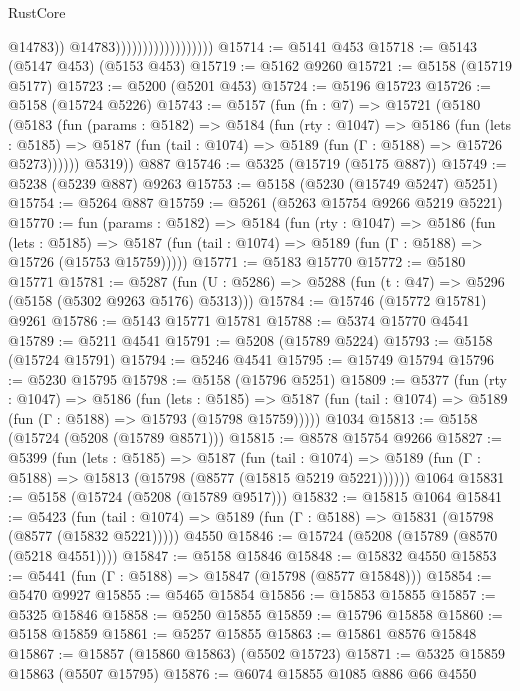\begin{lexlean}{RustCore}
\begin{coremodule}
                                            @14783))
                                        @14783))))))))))))))))))
@15714 := @5141 @453
@15718 := @5143 (@5147 @453) (@5153 @453)
@15719 := @5162 @9260
@15721 := @5158 (@15719 @5177)
@15723 := @5200 (@5201 @453)
@15724 := @5196 @15723
@15726 := @5158 (@15724 @5226)
@15743 := @5157
    (fun (fn : @7) =>
    @15721
      (@5180
        (@5183
          (fun (params : @5182) =>
          @5184
            (fun (rty : @1047) =>
            @5186
              (fun (lets : @5185) =>
              @5187 (fun (tail : @1074) => @5189 (fun (Γ : @5188) => @15726 @5273))))))
        @5319))
    @887
@15746 := @5325 (@15719 (@5175 @887))
@15749 := @5238 (@5239 @887) @9263
@15753 := @5158 (@5230 (@15749 @5247) @5251)
@15754 := @5264 @887
@15759 := @5261 (@5263 @15754 @9266 @5219 @5221)
@15770 := fun (params : @5182) =>
  @5184
    (fun (rty : @1047) =>
    @5186
      (fun (lets : @5185) =>
      @5187 (fun (tail : @1074) => @5189 (fun (Γ : @5188) => @15726 (@15753 @15759)))))
@15771 := @5183 @15770
@15772 := @5180 @15771
@15781 := @5287
    (fun (U : @5286) => @5288 (fun (t : @47) => @5296 (@5158 (@5302 @9263 @5176) @5313)))
@15784 := @15746 (@15772 @15781) @9261
@15786 := @5143 @15771 @15781
@15788 := @5374 @15770 @4541
@15789 := @5211 @4541
@15791 := @5208 (@15789 @5224)
@15793 := @5158 (@15724 @15791)
@15794 := @5246 @4541
@15795 := @15749 @15794
@15796 := @5230 @15795
@15798 := @5158 (@15796 @5251)
@15809 := @5377
    (fun (rty : @1047) =>
    @5186
      (fun (lets : @5185) =>
      @5187 (fun (tail : @1074) => @5189 (fun (Γ : @5188) => @15793 (@15798 @15759)))))
    @1034
@15813 := @5158 (@15724 (@5208 (@15789 @8571)))
@15815 := @8578 @15754 @9266
@15827 := @5399
    (fun (lets : @5185) =>
    @5187
      (fun (tail : @1074) =>
      @5189 (fun (Γ : @5188) => @15813 (@15798 (@8577 (@15815 @5219 @5221))))))
    @1064
@15831 := @5158 (@15724 (@5208 (@15789 @9517)))
@15832 := @15815 @1064
@15841 := @5423
    (fun (tail : @1074) => @5189 (fun (Γ : @5188) => @15831 (@15798 (@8577 (@15832 @5221)))))
    @4550
@15846 := @15724 (@5208 (@15789 (@8570 (@5218 @4551))))
@15847 := @5158 @15846
@15848 := @15832 @4550
@15853 := @5441 (fun (Γ : @5188) => @15847 (@15798 (@8577 @15848)))
@15854 := @5470 @9927
@15855 := @5465 @15854
@15856 := @15853 @15855
@15857 := @5325 @15846
@15858 := @5250 @15855
@15859 := @15796 @15858
@15860 := @5158 @15859
@15861 := @5257 @15855
@15863 := @15861 @8576 @15848
@15867 := @15857 (@15860 @15863) (@5502 @15723)
@15871 := @5325 @15859 @15863 (@5507 @15795)
@15876 := @6074 @15855 @1085 @886 @66 @4550

\end{coremodule}
\end{lexlean}
